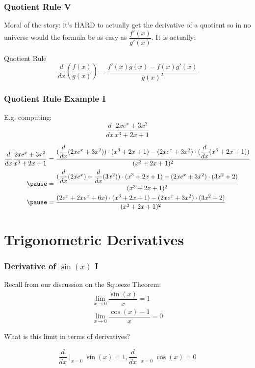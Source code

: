 \documentclass{ltx-talk}
\begin{document}
\begin{frame}
  \frametitle{Quotient Rule V}

  Moral of the story: it's HARD to actually get the derivative of a quotient \pause so in no universe would the formula be as easy as $\dfrac{f'(x)}{g'(x)}$. \pause It is actually: \pause

  \begin{alertblock}{Quotient Rule}
    \begin{equation}
      \dfrac{d}{dx} \left(\dfrac{f(x)}{g(x)}\right) = \dfrac{f'(x) g(x) - f(x)g'(x)}{g(x)^2}
    \end{equation}
  \end{alertblock}
\end{frame}

\begin{frame}
  \frametitle{Quotient Rule Example I}
  E.g. computing:
  \begin{equation}
    \dfrac{d}{dx} \dfrac{2xe^x + 3x^2}{x^3 + 2x + 1}
  \end{equation} \pause

  \begin{align}
    \dfrac{d}{dx} \dfrac{2xe^x + 3x^2}{x^3 + 2x + 1} &= \dfrac{(\dfrac{d}{dx} (2xe^x + 3x^2)) \cdot (x^3 + 2x + 1) - (2xe^x + 3x^2) \cdot (\dfrac{d}{dx}(x^3 + 2x + 1))}{(x^3 + 2x + 1)^2} \\ \pause
                                                     &= \dfrac{(\dfrac{d}{dx}(2xe^x) + \dfrac{d}{dx}(3x^2))\cdot (x^3 + 2x + 1) - (2xe^x + 3x^2) \cdot (3x^2 + 2)}{(x^3 + 2x + 1)^2} \\ \pause
                                                     &= \dfrac{(2e^x + 2xe^x + 6x)\cdot(x^3 + 2x + 1) - (2xe^x + 3x^2)\cdot (3x^2 + 2)}{(x^3 + 2x + 1)^2}
  \end{align}
\end{frame}

\section{Trigonometric Derivatives}

\begin{frame}
  \frametitle{Derivative of $\sin(x)$ I}

  Recall from our discussion on the Squeeze Theorem:
  \begin{gather}
    \lim\limits_{x \rightarrow 0} \dfrac{\sin(x)}{x} = 1 \\
    \lim\limits_{x \rightarrow 0} \dfrac{\cos(x) - 1}{x} = 0
  \end{gather} \pause

  What is this limit in terms of derivatives? \pause

  \begin{gather}
    \dfrac{d}{dx} \mid_{x = 0} \sin(x) = 1,
    \dfrac{d}{dx} \mid_{x = 0} \cos(x) = 0
  \end{gather}
\end{frame}
\end{document}
